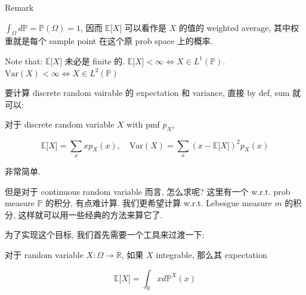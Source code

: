 \begin{qlremark}{Remark}

\(\int_{\Omega}\mathit{d}\mathbb{P} = \mathbb{P}(\Omega) = 1\), 因而 \(\mathbb{E}\lbrack\mathit{X}\rbrack\) 可以看作是 \(\mathit{X}\) 的值的 weighted average, 其中权重就是每个 sample point 在这个原 prob space 上的概率.

Note that: \(\mathbb{E}\lbrack\mathit{X}\rbrack\) 未必是 finite 的. \(\mathbb{E}\lbrack\mathit{X}\rbrack < \infty\Leftrightarrow\mathit{X} \in \mathit{L}^{1}(\mathbb{P})\). \(\text{Var}(\mathit{X}) < \infty\Leftrightarrow\mathit{X} \in \mathit{L}^{2}(\mathbb{P})\)

\end{qlremark}

要计算 discrete random vairable 的 expectation 和 variance, 直接 by def, sum 就可以:

\begin{proposition}{}

对于 discrete random variable \(\mathit{X}\) with pmf \(\mathit{p}_{\mathit{X}}\),

\[\mathbb{E}\lbrack\mathit{X}\rbrack = \sum\limits_{\mathit{x}}\mathit{x}\mathit{p}_{\mathit{X}}(\mathit{x}),\quad\text{Var}(\mathit{X}) = \sum\limits_{\mathit{x}}(\mathit{x} - \mathbb{E}\lbrack\mathit{X}\rbrack)^{2}\mathit{p}_{\mathit{X}}(\mathit{x})\]

\end{proposition}

非常简单.

但是对于 continuous random variable 而言, 怎么求呢? 这里有一个 w.r.t. prob measure \(\mathbb{P}\) 的积分, 有点难计算. 我们更希望计算 w.r.t. Lebesgue measure \(\mathit{m}\) 的积分, 这样就可以用一些经典的方法来算它了.

为了实现这个目标, 我们首先需要一个工具来过渡一下:

\begin{lemma}{}

对于 random variable \(\mathit{X}:\Omega\rightarrow\mathbb{R}\), 如果 \(\mathit{X}\) integrable, 那么其 expectation

\[\mathbb{E}\lbrack\mathit{X}\rbrack = \int_{\mathbb{R}}\mathit{x}\mathit{d}\mathbb{P}^{\mathit{X}}(\mathit{x})\]

\end{lemma}


